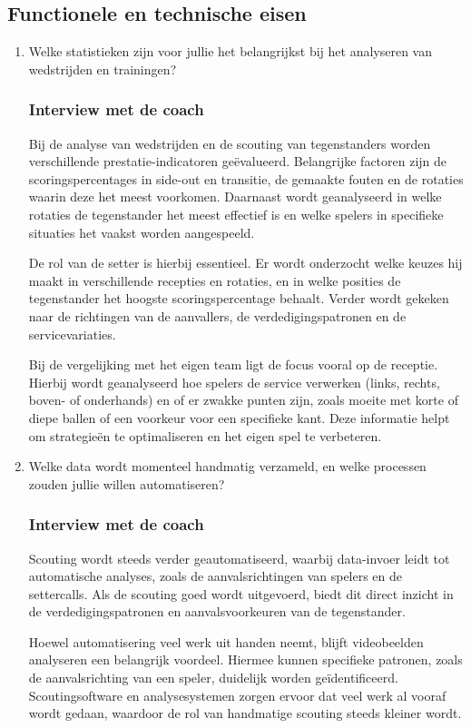 \subsection{Functionele en technische eisen}
\begin{enumerate}
  \item Welke statistieken zijn voor jullie het belangrijkst bij het analyseren van wedstrijden en trainingen?
  \subsubsection{Interview met de coach}
  Bij de analyse van wedstrijden en de scouting van tegenstanders worden verschillende prestatie-indicatoren geëvalueerd. Belangrijke factoren zijn de scoringspercentages in side-out en transitie, de gemaakte fouten en de rotaties waarin deze het meest voorkomen. Daarnaast wordt geanalyseerd in welke rotaties de tegenstander het meest effectief is en welke spelers in specifieke situaties het vaakst worden aangespeeld.

  De rol van de setter is hierbij essentieel. Er wordt onderzocht welke keuzes hij maakt in verschillende recepties en rotaties, en in welke posities de tegenstander het hoogste scoringspercentage behaalt. Verder wordt gekeken naar de richtingen van de aanvallers, de verdedigingspatronen en de servicevariaties.
  
  Bij de vergelijking met het eigen team ligt de focus vooral op de receptie. Hierbij wordt geanalyseerd hoe spelers de service verwerken (links, rechts, boven- of onderhands) en of er zwakke punten zijn, zoals moeite met korte of diepe ballen of een voorkeur voor een specifieke kant. Deze informatie helpt om strategieën te optimaliseren en het eigen spel te verbeteren.

  \item Welke data wordt momenteel handmatig verzameld, en welke processen zouden jullie willen automatiseren?
  \subsubsection{Interview met de coach}
  Scouting wordt steeds verder geautomatiseerd, waarbij data-invoer leidt tot automatische analyses, zoals de aanvalsrichtingen van spelers en de settercalls. Als de scouting goed wordt uitgevoerd, biedt dit direct inzicht in de verdedigingspatronen en aanvalsvoorkeuren van de tegenstander.

  Hoewel automatisering veel werk uit handen neemt, blijft videobeelden analyseren een belangrijk voordeel. Hiermee kunnen specifieke patronen, zoals de aanvalsrichting van een speler, duidelijk worden geïdentificeerd. Scoutingsoftware en analysesystemen zorgen ervoor dat veel werk al vooraf wordt gedaan, waardoor de rol van handmatige scouting steeds kleiner wordt.


\end{enumerate}
